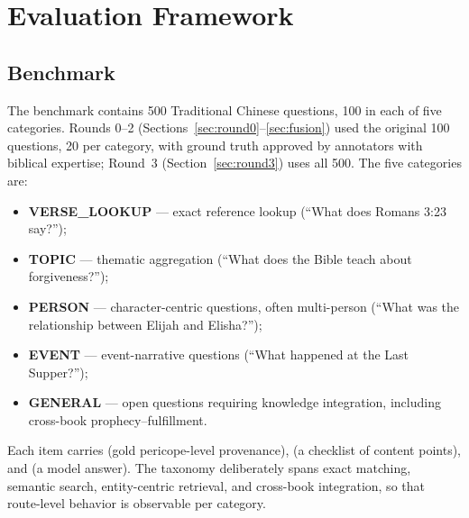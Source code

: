 
\section{Evaluation Framework}
\label{sec:eval}

\subsection{Benchmark}
\label{sec:benchmark}

The benchmark contains 500 Traditional Chinese questions, 100 in each of
five categories. Rounds 0--2 (Sections~\ref{sec:round0}--\ref{sec:fusion})
used the original 100 questions, 20 per category, with ground truth
approved by annotators with biblical expertise; Round~3
(Section~\ref{sec:round3}) uses all 500. The five categories are:

\begin{itemize}
\item \textbf{VERSE\_LOOKUP} --- exact reference lookup (``What does
Romans 3:23 say?'');
\item \textbf{TOPIC} --- thematic aggregation (``What does the Bible
teach about forgiveness?'');
\item \textbf{PERSON} --- character-centric questions, often
multi-person (``What was the relationship between Elijah and Elisha?'');
\item \textbf{EVENT} --- event-narrative questions (``What happened at
the Last Supper?'');
\item \textbf{GENERAL} --- open questions requiring knowledge
integration, including cross-book prophecy--fulfillment.
\end{itemize}

Each item carries  (gold pericope-level provenance),
 (a checklist of content points), and
 (a model answer). The taxonomy deliberately
spans exact matching, semantic search, entity-centric retrieval, and
cross-book integration, so that route-level behavior is observable per
category.

